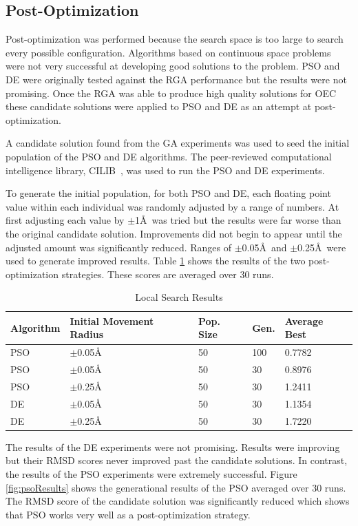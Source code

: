 \documentclass[conference]{IEEEtran}
\begin{document}
\subsection{Post-Optimization}

Post-optimization was performed because the search space is too large to search every possible configuration. Algorithms based on continuous space problems were not very successful at developing good solutions to the problem. PSO and DE were originally tested against the RGA performance but the results were not promising. Once the RGA was able to produce high quality solutions for OEC these candidate solutions were applied to PSO and DE as an attempt at post-optimization. 

A candidate solution found from the GA experiments was used to seed the initial population of the PSO and DE algorithms. The peer-reviewed computational intelligence library, CILIB~\cite{cilib}, was used to run the PSO and DE experiments.

To generate the initial population, for both PSO and DE, each floating point value within each individual was randomly adjusted by a range of numbers. At first adjusting each value by $\pm$1\AA\ was tried but the results were far worse than the original candidate solution. Improvements did not begin to appear until the adjusted amount was significantly reduced. Ranges of $\pm$0.05\AA\ and $\pm$0.25\AA\ were used to generate improved results. Table \ref{table:localResults} shows the results of the two post-optimization strategies. These scores are averaged over 30 runs.

\begin{table}
\caption{Local Search Results}
\label{table:localResults}
\centering
\begin{tabular}{ | l | l | l | l | l | }
  \hline
    Algorithm & Initial Movement Radius & Pop. Size & Gen. & Average Best \\ \hline
    PSO & $\pm$0.05\AA & 50 & 100 & 0.7782 \\ \hline
    PSO & $\pm$0.05\AA & 50 & 30 & 0.8976 \\ \hline
    PSO & $\pm$0.25\AA & 50 & 30 & 1.2411 \\ \hline
    DE & $\pm$0.05\AA & 50 & 30 & 1.1354 \\ \hline
    DE & $\pm$0.25\AA & 50 & 30 & 1.7220 \\ \hline
\end{tabular}
\end{table}

The results of the DE experiments were not promising. Results were improving but their RMSD scores never improved past the candidate solutions. In contrast, the results of the PSO experiments were extremely successful. Figure \ref{fig:psoResults} shows the generational results of the PSO averaged over 30 runs. The RMSD score of the candidate solution was significantly reduced which shows that PSO works very well as a post-optimization strategy. 
\end{document}

